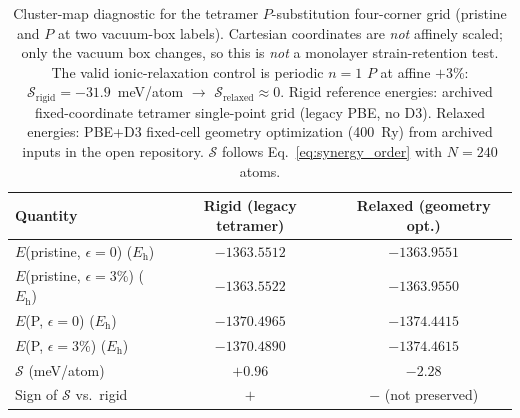 \begin{table}[t]



\begin{table}[t]
\caption{\label{tab:relaxext}Cluster-map diagnostic for the tetramer $P$-substitution four-corner grid (pristine and $P$ at two vacuum-box labels). Cartesian coordinates are \emph{not} affinely scaled; only the vacuum box changes, so this is \emph{not} a monolayer strain-retention test. The valid ionic-relaxation control is periodic $n{=}1$ $P$ at affine $+3$\%: $\mathcal{S}_{\mathrm{rigid}}=-31.9$~meV/atom $\to$ $\mathcal{S}_{\mathrm{relaxed}}\approx 0$. Rigid reference energies: archived fixed-coordinate tetramer single-point grid (legacy PBE, no D3). Relaxed energies: PBE+D3 fixed-cell geometry optimization (400~Ry) from archived inputs in the open repository. $\mathcal{S}$ follows Eq.~\eqref{eq:synergy_order} with $N{=}240$ atoms.}
\begin{ruledtabular}
\begin{tabular}{lcc}
Quantity & Rigid (legacy tetramer) & Relaxed (geometry opt.) \\
\hline
$E$(pristine, $\epsilon{=}0$) ($E_{\mathrm{h}}$) & $-1363.5512$ & $-1363.9551$ \\
$E$(pristine, $\epsilon{=}3$\%) ($E_{\mathrm{h}}$) & $-1363.5522$ & $-1363.9550$ \\
$E$(P, $\epsilon{=}0$) ($E_{\mathrm{h}}$) & $-1370.4965$ & $-1374.4415$ \\
$E$(P, $\epsilon{=}3$\%) ($E_{\mathrm{h}}$) & $-1370.4890$ & $-1374.4615$ \\
$\mathcal{S}$ (meV/atom) & $+0.96$ & $-2.28$ \\
Sign of $\mathcal{S}$ vs.\ rigid & $+$ & $-$ (not preserved) \\
\end{tabular}
\end{ruledtabular}
\end{table}


\end{table}
